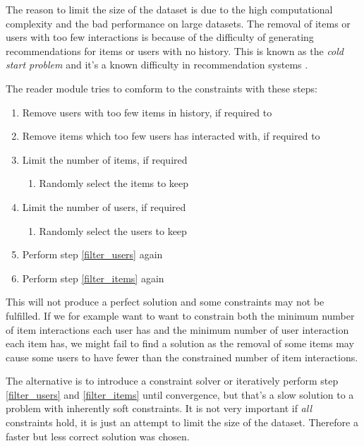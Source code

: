 The reason to limit the size of the dataset is due to the high computational complexity and the bad performance on large datasets. The removal of items or users with too few interactions is because of the difficulty of generating recommendations for items or users with no history. This is known as the \textit{cold start problem} and it's a known difficulty in recommendation systems \citep{cacheda2011comparison}.

The reader module tries to comform to the constraints with these steps:

\begin{enumerate}
    \item \label{filter_users} Remove users with too few items in history, if required to
    \item \label{filter_items} Remove items which too few users has interacted with, if required to

    \item Limit the number of items, if required
        \begin{enumerate}
            \item Randomly select the items to keep
        \end{enumerate}
    \item Limit the number of users, if required
        \begin{enumerate}
            \item Randomly select the users to keep
        \end{enumerate}

    \item Perform step \ref{filter_users} again
    \item Perform step \ref{filter_items} again
\end{enumerate}

This will not produce a perfect solution and some constraints may not be fulfilled. If we for example want to want to constrain both the minimum number of item interactions each user has and the minimum number of user interaction each item has, we might fail to find a solution as the removal of some items may cause some users to have fewer than the constrained number of item interactions.

The alternative is to introduce a constraint solver or iteratively perform step \ref{filter_users} and \ref{filter_items} until convergence, but that's a slow solution to a problem with inherently soft constraints. It is not very important if \textit{all} constraints hold, it is just an attempt to limit the size of the dataset. Therefore a faster but less correct solution was chosen.

